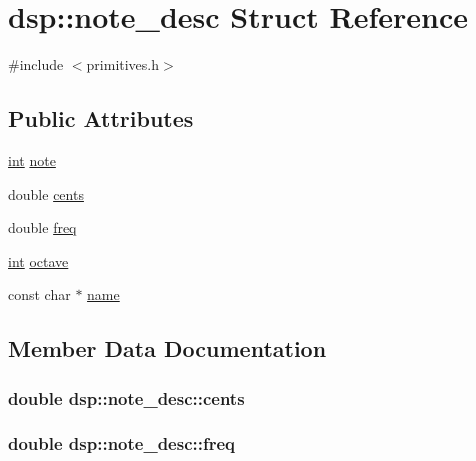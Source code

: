 \hypertarget{structdsp_1_1note__desc}{}\section{dsp\+:\+:note\+\_\+desc Struct Reference}
\label{structdsp_1_1note__desc}


{\ttfamily \#include $<$primitives.\+h$>$}

\subsection*{Public Attributes}
\begin{DoxyCompactItemize}
\item 
\hyperlink{tk_8h_a83f82f76e7fed06f4c49d2db94028a6d}{int} \hyperlink{structdsp_1_1note__desc_a84886c1623012754e704bccceff2bf77}{note}
\item 
double \hyperlink{structdsp_1_1note__desc_aba3eed02a28f8eff6f3356b736514b36}{cents}
\item 
double \hyperlink{structdsp_1_1note__desc_a0623db31608eb3fbf3e14ac444cb432b}{freq}
\item 
\hyperlink{tk_8h_a83f82f76e7fed06f4c49d2db94028a6d}{int} \hyperlink{structdsp_1_1note__desc_a6d055655b05fa2cdcf90e78a30707c9a}{octave}
\item 
const char $\ast$ \hyperlink{structdsp_1_1note__desc_a15af0c113deeaec3f7c67ad6377f1316}{name}
\end{DoxyCompactItemize}


\subsection{Member Data Documentation}
\subsubsection[{\texorpdfstring{cents}{cents}}]{\setlength{\rightskip}{0pt plus 5cm}double dsp\+::note\+\_\+desc\+::cents}\hypertarget{structdsp_1_1note__desc_aba3eed02a28f8eff6f3356b736514b36}{}\label{structdsp_1_1note__desc_aba3eed02a28f8eff6f3356b736514b36}
\subsubsection[{\texorpdfstring{freq}{freq}}]{\setlength{\rightskip}{0pt plus 5cm}double dsp\+::note\+\_\+desc\+::freq}\hypertarget{structdsp_1_1note__desc_a0623db31608eb3fbf3e14ac444cb432b}{}\label{structdsp_1_1note__desc_a0623db31608eb3fbf3e14ac444cb432b}
